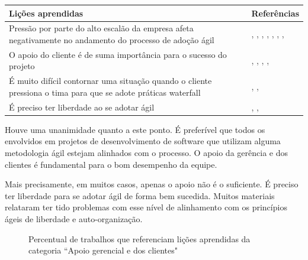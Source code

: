 \begin{table}[H]
	\centering
	\begin{tabularx}{\linewidth}{ | X | p{5cm} | } \hline \textbf{Lições aprendidas} & \textbf{Referências} \\ \hline
		Pressão por parte do alto escalão da empresa afeta negativamente no andamento do processo de adoção ágil & \cite{Hajjdiab2011}, \cite{Cisco2011}, \cite{Claudia2013}, \cite{Parzinello2012}, \cite{Stefano2013}, \cite{Bastos2013}, \cite{Maciel2013}, \cite{Srinath2012} \\ \hline
		O apoio do cliente é de suma importância para o sucesso do projeto & \cite{Arikpo2011}, \cite{Claudia2013}, \cite{Parzinello2012}, \cite{Stefano2013}, \cite{Maciel2013} \\ \hline
		É muito difícil contornar uma situação quando o cliente pressiona o tima para que se adote práticas waterfall & \cite{Claudia2013}, \cite{Piegas2012}, \cite{Srinath2012} \\ \hline
		É preciso ter liberdade ao se adotar ágil & \cite{Piegas2012}, \cite{Stefano2013}, \cite{Maciel2013} \\ \hline
	\end{tabularx}
\end{table}

Houve uma unanimidade quanto a este ponto. É preferível que todos os envolvidos em projetos de desenvolvimento de software que utilizam alguma metodologia ágil estejam alinhados com o processo. O apoio da gerência e dos clientes é fundamental para o bom desempenho da equipe.

Mais precisamente, em muitos casos, apenas o apoio não é o suficiente. É preciso ter liberdade para se adotar ágil de forma bem sucedida. Muitos materiais \cite{Piegas2012,Stefano2013,Maciel2013} relataram ter tido problemas com esse nível de alinhamento com os princípios ágeis de liberdade e auto-organização.

\begin{figure}[H]
	\centering
	\captionsetup{justification=centering}
	\caption{Percentual de trabalhos que referenciam lições aprendidas da categoria ``Apoio gerencial e dos clientes"}
	\label{fig:apoio}
\end{figure}

